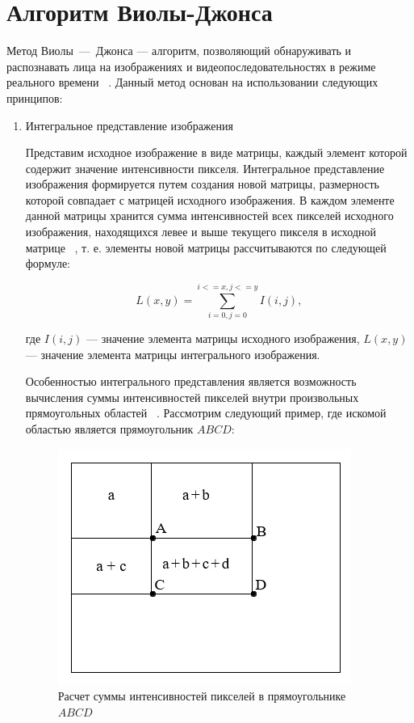 \chapter{Алгоритм Виолы-Джонса}

Метод Виолы~---~Джонса --- алгоритм, позволяющий обнаруживать и распознавать лица на изображениях и видеопоследовательностях в режиме реального времени ~\cite{viola}. Данный метод основан на использовании следующих принципов:
\begin{enumerate}[label=\arabic*.]
    \item Интегральное представление изображения

    Представим исходное изображение в виде матрицы, каждый элемент которой содержит значение интенсивности пикселя. Интегральное представление изображения формируется путем создания новой матрицы, размерность которой совпадает с матрицей исходного изображения. В каждом элементе данной матрицы хранится сумма интенсивностей всех пикселей исходного изображения, находящихся левее и выше текущего пикселя в исходной матрице ~\cite{tomsk}, т. е. элементы новой матрицы рассчитываются по следующей формуле:
    
    \begin{equation}
        L(x,y) = \sum_{i=0, j=0}^{i<=x, j<=y} I(i,j),
    \end{equation}

    где $I(i, j)$ --- значение элемента матрицы исходного изображения, $L(x,y)$ --- значение элемента матрицы интегрального изображения.

    Особенностью интегрального представления является возможность вычисления суммы интенсивностей пикселей внутри произвольных прямоугольных областей ~\cite{tomsk}. Рассмотрим следующий пример, где искомой областью является прямоугольник $ABCD$:

    \begin{figure}[h]
	\centering
	\includegraphics[height=0.25\textheight]{img/integral.jpg}
	\caption{Расчет суммы интенсивностей пикселей в прямоугольнике $ABCD$}
    \label{img:integral}
    \end{figure}


\end{enumerate}
